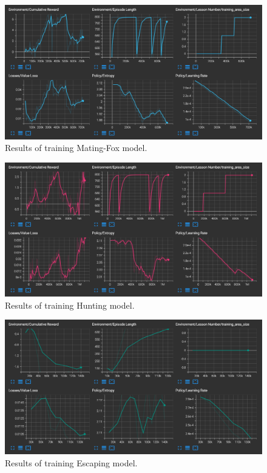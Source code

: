 \begin{figure}
    \centering
    \includegraphics[width=\textwidth]{Images/result_mating_fox_v2.png}
    \caption{Results of training Mating-Fox model.}
    \label{fig:matingFoxTrainingResults}
\end{figure}

\begin{figure}
    \centering
    \includegraphics[width=\textwidth]{Images/result_hunting_v2.png}
    \caption{Results of training Hunting model.}
    \label{fig:huntingTrainingResults}
\end{figure}

\begin{figure}
    \centering
    \includegraphics[width=\textwidth]{Images/result_escaping_v2.png}
    \caption{Results of training Escaping model.}
    \label{fig:escapingTrainingResults}
\end{figure}